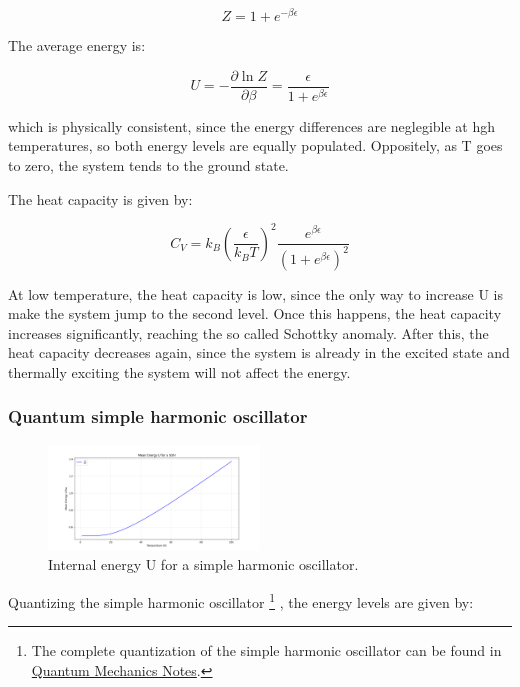 \documentclass{article}
\begin{document}
\begin{equation}
    Z=1+e^{-\beta\epsilon}
\end{equation}

The average energy is:

\begin{equation}
    U=-\frac{\partial\ln{Z}}{\partial\beta}= \frac{\epsilon}{1+e^{\beta\epsilon}}
\end{equation}

which is physically consistent, since the energy differences are neglegible at hgh temperatures,
so both energy levels are equally populated. Oppositely, as T goes to zero, the system tends to the ground state.

The heat capacity is given by:

\begin{equation}
    C_V=k_B\left(\frac{\epsilon}{k_BT}\right)^2\frac{e^{\beta\epsilon}}{(1+e^{\beta\epsilon})^2}
\end{equation}

At low temperature, the heat capacity is low, since the only way to increase
U is make the system jump to the second level. Once this happens, the heat capacity increases significantly, reaching the so called Schottky anomaly.
After this, the heat capacity decreases again, since the system is already in the excited state and thermally exciting the system will not affect the energy.


\subsubsection{Quantum simple harmonic oscillator}

\begin{figure}[h!]
    \centering
    \includegraphics[width=0.5\textwidth]{images/u-soh.png}
    \caption{
        Internal energy U for a simple harmonic oscillator.
    }
    \label{fig:u-soh}
\end{figure}

Quantizing the simple harmonic oscillator
\footnote{
    The complete quantization of the simple harmonic oscillator can be found in
    \href{https://cesaresabattini.github.io/Physics-Lecture-Notes/}{Quantum Mechanics Notes}.
}
, the energy levels are given by:
\end{document}
